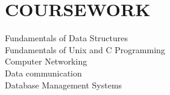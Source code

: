 \documentclass[]{deedy-resume-openfont}
\begin{document}
\begin{minipage}[t]{0.33\textwidth}
\section{COURSEWORK}
\textbullet{}Fundamentals of Data Structures\\
\textbullet{}Fundamentals of Unix and C
 Programming \\
\textbullet{}Computer Networking\\
\textbullet{}Data communication \\
\textbullet{}Database Management Systems

%
%

\end{minipage} 
\hfill
\end{document}
